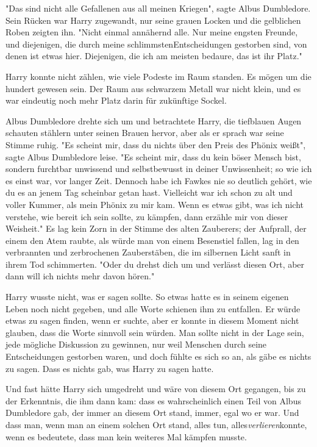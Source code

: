 {"Das sind nicht alle Gefallenen aus all meinen Kriegen", sagte Albus Dumbledore. Sein Rücken war Harry zugewandt, nur seine grauen Locken und die gelblichen Roben zeigten ihn. "Nicht einmal annähernd alle. Nur meine engsten Freunde, und diejenigen, die durch meine schlimmstenEntscheidungen gestorben sind, von denen ist etwas hier. Diejenigen, die ich am meisten bedaure, das ist ihr Platz."

Harry konnte nicht zählen, wie viele Podeste im Raum standen. Es mögen um die hundert gewesen sein. Der Raum aus schwarzem Metall war nicht klein, und es war eindeutig noch mehr Platz darin für zukünftige Sockel.

Albus Dumbledore drehte sich um und betrachtete Harry, die tiefblauen Augen schauten stählern unter seinen Brauen hervor, aber als er sprach war seine Stimme ruhig. "Es scheint mir, dass du nichts über den Preis des Phönix weißt", sagte Albus Dumbledore leise. "Es scheint mir, dass du kein böser Mensch bist, sondern furchtbar unwissend und selbstbewusst in deiner Unwissenheit; so wie ich es einst war, vor langer Zeit. Dennoch habe ich Fawkes nie so deutlich gehört, wie du es an jenem Tag scheinbar getan hast. Vielleicht war ich schon zu alt und voller Kummer, als mein Phönix zu mir kam. Wenn es etwas gibt, was ich nicht verstehe, wie bereit ich sein sollte, zu kämpfen, dann erzähle mir von dieser Weisheit." Es lag kein Zorn in der Stimme des alten Zauberers; der Aufprall, der einem den Atem raubte, als würde man von einem Besenstiel fallen, lag in den verbrannten und zerbrochenen Zauberstäben, die im silbernen Licht sanft in ihrem Tod schimmerten. "Oder du drehst dich um und verlässt diesen Ort, aber dann will ich nichts mehr davon hören."

Harry wusste nicht, was er sagen sollte. So etwas hatte es in seinem eigenen Leben noch nicht gegeben, und alle Worte schienen ihm zu entfallen. Er würde etwas zu sagen finden, wenn er suchte, aber er konnte in diesem Moment nicht glauben, dass die Worte sinnvoll sein würden. Man sollte nicht in der Lage sein, jede mögliche Diskussion zu gewinnen, nur weil Menschen durch seine Entscheidungen gestorben waren, und doch fühlte es sich so an, als gäbe es nichts zu sagen. Dass es nichts gab, was Harry zu sagen hatte.

Und fast hätte Harry sich umgedreht und wäre von diesem Ort gegangen, bis zu der Erkenntnis, die ihm dann kam: dass es wahrscheinlich einen Teil von Albus Dumbledore gab, der immer an diesem Ort stand, immer, egal wo er war. Und dass man, wenn man an einem solchen Ort stand, alles tun, alles\emph{verlieren}konnte, wenn es bedeutete, dass man kein weiteres Mal kämpfen musste.

}
